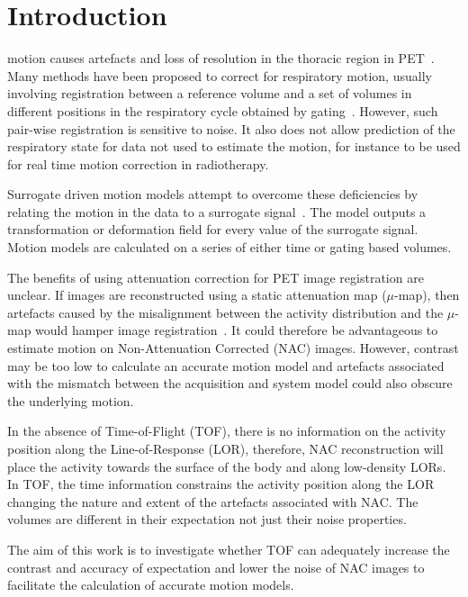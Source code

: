 \documentclass{IEEEtran}
\begin{document}
\section{Introduction}
 motion causes artefacts and loss of resolution in the thoracic region in PET~\cite{Nehmeh2008}. Many methods have been proposed to correct for respiratory motion, usually involving registration between a reference volume and a set of volumes in different positions in the respiratory cycle obtained by gating~\cite{Oliveira2014}. However, such pair-wise registration is sensitive to noise. It also does not allow prediction of the respiratory state for data not used to estimate the motion, for instance to be used for real time motion correction in radiotherapy.

Surrogate driven motion models attempt to overcome these deficiencies by relating the motion in the data to a surrogate signal~\cite{McClelland2013}. The model outputs a transformation or deformation field for every value of the surrogate signal. Motion models are calculated on a series of either time or gating based volumes.

The benefits of using attenuation correction for PET image registration are unclear. If images are reconstructed using a static attenuation map ($\mu$-map), then artefacts caused by the misalignment between the activity distribution and the $\mu$-map would hamper image registration~\cite{Bousse2016a}. It could therefore be advantageous to estimate motion on Non-Attenuation Corrected (NAC) images. However, contrast may be too low to calculate an accurate motion model and artefacts associated with the mismatch between the acquisition and system model could also obscure the underlying motion. 

In the absence of Time-of-Flight (TOF), there is no information on the activity position along the Line-of-Response (LOR), therefore, NAC reconstruction will place the activity towards the surface of the body and along low-density LORs. In TOF, the time information constrains the activity position along the LOR changing the nature and extent of the artefacts associated with NAC. The volumes are different in their expectation not just their noise properties.

The aim of this work is to investigate whether TOF can adequately increase the contrast and accuracy of expectation and lower the noise of NAC images to facilitate the calculation of accurate motion models.
\end{document}
